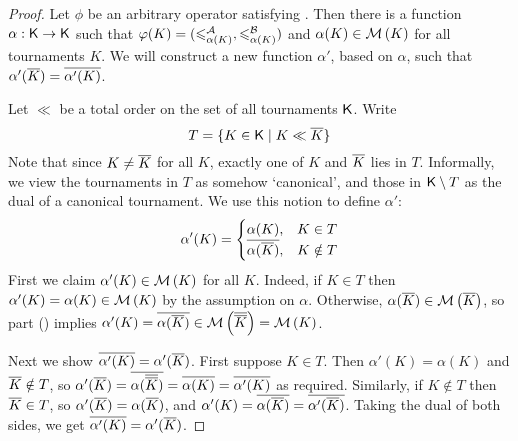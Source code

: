 \begin{proof}
    Let $\phi$ be an arbitrary operator satisfying \chainmin{}. Then
    there is a function $\alpha: \mathsf{K} \to \mathsf{K}$ such that $\varphi(K) =
    ({\leqslant^{\mathcal{A}}_{\alpha(K)}}, {\leqslant^{\mathcal{B}}_{\alpha(K)}})$ and $\alpha(K) \in \operatorname{\mathcal{M}}\left({K}\right)$
    for all tournaments $K$. We will construct a new function $\alpha'$, based
    on $\alpha$, such that $\alpha'({\overline{K}}) = {\overline{\alpha'(K)}}$.

    Let $\ll$ be a total order on the set of all tournaments
    $\mathsf{K}$.\footnotemark{} Write
    \[
        T = \{K \in \mathsf{K} \mid K \ll {\overline{K}}\}
    \]
    Note that since $K \ne {\overline{K}}$ for all $K$, exactly one of $K$ and
    ${\overline{K}}$ lies in $T$. Informally, we view the tournaments in $T$ as
    somehow `canonical', and those in $\mathsf{K} \setminus T$ as the dual of a
    canonical tournament. We use this notion to define $\alpha'$:
    \[
        \alpha'(K) = \begin{cases}
            \alpha(K),& K \in T \\
            {\overline{\alpha({\overline{K}})}},& K \notin T
        \end{cases}
    \]
    First we claim $\alpha'(K) \in \operatorname{\mathcal{M}}\left({K}\right)$ for all $K$. Indeed, if $K \in T$
    then $\alpha'(K) = \alpha(K) \in \operatorname{\mathcal{M}}\left({K}\right)$ by the assumption on $\alpha$.
    Otherwise, $\alpha({\overline{K}}) \in \operatorname{\mathcal{M}}\left({{\overline{K}}}\right)$, so
     part ()
    implies $\alpha'(K) = {\overline{\alpha({\overline{K}})}} \in \operatorname{\mathcal{M}}\left({{\overline{{\overline{K}}}}}\right) =
    \operatorname{\mathcal{M}}\left({K}\right)$.

    Next we show ${\overline{\alpha'(K)}} = \alpha'({\overline{K}})$. First suppose $K \in
    T$. Then $\alpha'(K) = \alpha(K)$ and ${\overline{K}} \notin T$, so
    $\alpha'({\overline{K}}) = {\overline{\alpha({\overline{{\overline{K}}}})}} = {\overline{\alpha(K)}} =
    {\overline{\alpha'(K)}}$ as required. Similarly, if $K \notin T$ then ${\overline{K}}
    \in T$, so $\alpha'({\overline{K}}) = \alpha({\overline{K}})$, and $\alpha'(K) =
    {\overline{\alpha({\overline{K}})}} = {\overline{\alpha'({\overline{K}})}}$. Taking the dual of
    both sides, we get ${\overline{\alpha'(K)}} = \alpha'({\overline{K}})$.


\end{proof}
